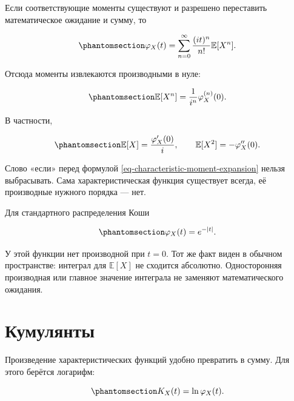 \documentclass[
  russian,
  11pt,
  a4paper,
  open=any]{scrbook}
\begin{document}
Если соответствующие моменты существуют и разрешено переставить
математическое ожидание и сумму, то

\begin{equation}\protect\phantomsection\label{eq-characteristic-moment-expansion}{
\varphi_X(t)
=\sum_{n=0}^{\infty}
\frac{(it)^n}{n!}\mathbb E[X^n].
}\end{equation}

Отсюда моменты извлекаются производными в нуле:

\begin{equation}\protect\phantomsection\label{eq-moments-from-characteristic}{
\mathbb E[X^n]
=\frac{1}{i^n}\varphi_X^{(n)}(0).
}\end{equation}

В частности,

\begin{equation}\protect\phantomsection\label{eq-first-two-moments-from-characteristic}{
\mathbb E[X]=\frac{\varphi_X'(0)}{i},
\qquad
\mathbb E[X^2]=-\varphi_X''(0).
}\end{equation}

Слово «если» перед формулой \ref{eq-characteristic-moment-expansion}
нельзя выбрасывать. Сама характеристическая функция существует всегда,
её производные нужного порядка --- нет.

Для стандартного распределения Коши

\begin{equation}\protect\phantomsection\label{eq-cauchy-characteristic-at-zero}{
\varphi_X(t)=e^{-|t|}.
}\end{equation}

У этой функции нет производной при \(t=0\). Тот же факт виден в обычном
пространстве: интеграл для \(\mathbb E[X]\) не сходится абсолютно.
Односторонняя производная или главное значение интеграла не заменяют
математического ожидания.

\section{Кумулянты}\label{ux43aux443ux43cux443ux43bux44fux43dux442ux44b}

Произведение характеристических функций удобно превратить в сумму. Для
этого берётся логарифм:

\begin{equation}\protect\phantomsection\label{eq-cumulant-generating-function}{
K_X(t)=\ln\varphi_X(t).
}\end{equation}
\end{document}
